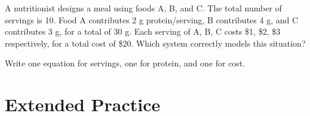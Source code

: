 \documentclass{ximera}
\begin{document}
\begin{problem}
A nutritionist designs a meal using foods A, B, and C. The total number of servings is 10. Food A contributes 2 g protein/serving, B contributes 4 g, and C contributes 3 g, for a total of 30 g. Each serving of A, B, C costs \$1, \$2, \$3 respectively, for a total cost of \$20. Which system correctly models this situation?
\begin{hint}
Write one equation for servings, one for protein, and one for cost.
\end{hint}
\begin{multipleChoice}
\end{multipleChoice}
\end{problem}


\bigskip
\section*{Extended Practice}
\end{document}
